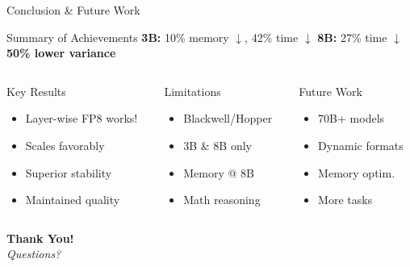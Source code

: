 \begin{frame}{Conclusion \& Future Work}

\begin{alertblock}{Summary of Achievements}
\small
\textbf{3B:} 10\% memory $\downarrow$, 42\% time $\downarrow$ \quad \textbf{8B:} 27\% time $\downarrow$ \quad \textbf{50\% lower variance}
\end{alertblock}

\vspace{0.2cm}

\begin{columns}[t]
\begin{column}{0.32\textwidth}
    \begin{block}{Key Results}
    \small
    \begin{itemize}
        \item Layer-wise FP8 works!
        \item Scales favorably
        \item Superior stability
        \item Maintained quality
    \end{itemize}
    \end{block}
\end{column}

\begin{column}{0.32\textwidth}
    \begin{block}{Limitations}
    \small
    \begin{itemize}
        \item Blackwell/Hopper
        \item 3B \& 8B only
        \item Memory @ 8B
        \item Math reasoning
    \end{itemize}
    \end{block}
\end{column}

\begin{column}{0.32\textwidth}
    \begin{block}{Future Work}
    \small
    \begin{itemize}
        \item 70B+ models
        \item Dynamic formats
        \item Memory optim.
        \item More tasks
    \end{itemize}
    \end{block}
\end{column}
\end{columns}

\vspace{0.5cm}

\begin{center}
\Large \textbf{Thank You!}\\
\vspace{0.3cm}
\normalsize \textit{Questions?}
\end{center}

\end{frame}
